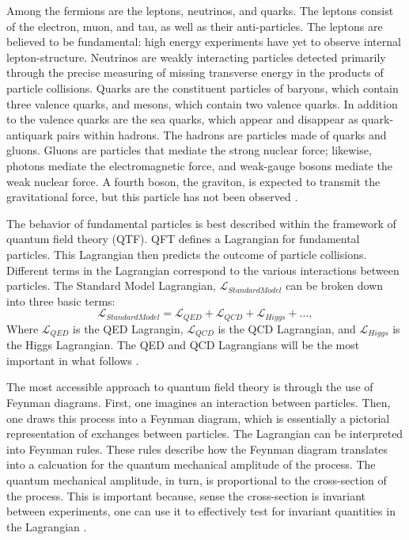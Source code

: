 Among the fermions are the leptons, neutrinos, and quarks. The leptons consist of the electron, muon, and tau, as well as their anti-particles. The leptons are believed to be fundamental: high energy experiments have yet to observe internal lepton-structure. Neutrinos are weakly interacting particles detected primarily through the precise measuring of missing transverse energy in the products of particle collisions. Quarks are the constituent particles of baryons, which contain three valence quarks, and mesons, which contain two valence quarks. In addition to the valence quarks are the sea quarks, which appear and disappear as quark-antiquark pairs within hadrons. The hadrons are particles made of quarks and gluons. Gluons are particles that mediate the strong nuclear force; likewise, photons mediate the electromagnetic force, and weak-gauge bosons mediate the weak nuclear force. A fourth boson, the graviton, is expected to transmit the gravitational force, but this particle has not been observed \cite{Halzen:1984mc}. 

The behavior of fundamental particles is best described within the framework of quantum field theory (QTF). QFT defines a Lagrangian for fundamental particles. This Lagrangian then predicts the outcome of particle collisions. Different terms in the Lagrangian correspond to the various interactions between particles. The Standard Model Lagrangian, $\mathcal{L}_{Standard Model}$ can be broken down into three basic terms:	
\begin{equation}
\mathcal{L}_{Standard Model} = \mathcal{L}_{QED} + \mathcal{L}_{QCD} + \mathcal{L}_{Higgs} + ... ,  
\end{equation} 
Where $\mathcal{L}_{QED}$ is the QED Lagrangin, $\mathcal{L}_{QCD}$ is the QCD Lagrangian, and $\mathcal{L}_{Higgs}$ is the Higgs Lagrangian. The QED and QCD Lagrangians will be the most important in what follows \cite{Halzen:1984mc}. 

The most accessible approach to quantum field theory is through the use of Feynman diagrams. First, one imagines an interaction between particles. Then, one draws this process into a Feynman diagram, which is essentially a pictorial representation of exchanges between particles. The Lagrangian can be interpreted into Feynman rules. These rules describe how the Feynman diagram translates into a calcuation for the quantum mechanical amplitude of the process. The quantum mechanical amplitude, in turn, is proportional to the cross-section of the process. This is important because, sense the cross-section is invariant between experiments, one can use it to effectively test for invariant quantities in the Lagrangian \cite{Peskin:1995ev}.

